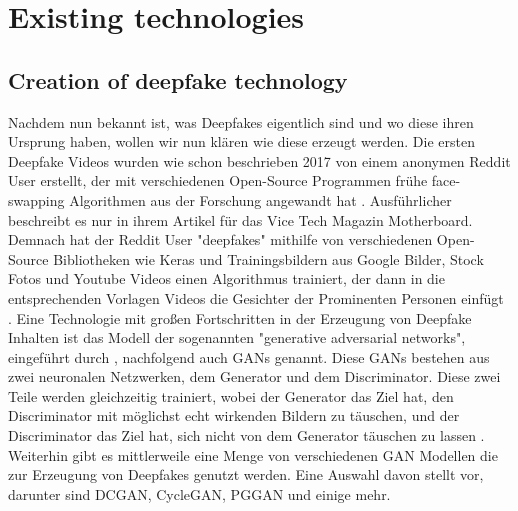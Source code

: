 \section{Existing technologies}
\subsection{Creation of deepfake technology}
Nachdem nun bekannt ist, was Deepfakes eigentlich sind und wo diese ihren Ursprung haben, wollen wir nun klären wie diese erzeugt werden.
Die ersten Deepfake Videos wurden wie schon beschrieben 2017 von einem anonymen Reddit User erstellt, 
der mit verschiedenen Open-Source Programmen frühe face-swapping Algorithmen aus der Forschung angewandt hat \cite{kernerPornDiscreditationEpistemic2021}. 
Ausführlicher beschreibt es nur \textcite{AIAssistedFakePorn2017} in ihrem Artikel für das Vice Tech Magazin Motherboard. 
Demnach hat der Reddit User "deepfakes" mithilfe von verschiedenen Open-Source Bibliotheken wie Keras und Trainingsbildern aus Google Bilder, 
Stock Fotos und Youtube Videos einen Algorithmus trainiert, der dann in die entsprechenden Vorlagen Videos die Gesichter der Prominenten Personen einfügt \cite{AIAssistedFakePorn2017}.
Eine Technologie mit großen Fortschritten in der Erzeugung von Deepfake Inhalten ist das Modell der sogenannten "generative adversarial networks", 
eingeführt durch \textcite{goodfellowGenerativeAdversarialNetworks2014}, nachfolgend auch GANs genannt. 
Diese GANs bestehen aus zwei neuronalen Netzwerken, dem Generator und dem Discriminator. 
Diese zwei Teile werden gleichzeitig trainiert, wobei der Generator das Ziel hat, den Discriminator mit möglichst echt wirkenden Bildern zu täuschen, 
und der Discriminator das Ziel hat, sich nicht von dem Generator täuschen zu lassen \cite{benaissaOverviewGANDeepFakesDetection2024}. 
Weiterhin gibt es mittlerweile eine Menge von verschiedenen GAN Modellen die zur Erzeugung von Deepfakes genutzt werden. 
Eine Auswahl davon stellt \textcite{benaissaOverviewGANDeepFakesDetection2024}vor, darunter sind DCGAN, CycleGAN, PGGAN und einige mehr.

